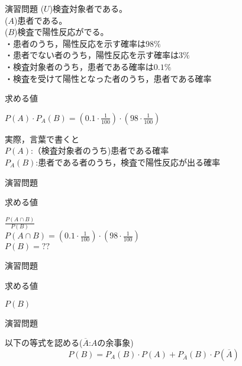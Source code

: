 \documentclass[aspectratio=169, dvipdfmx, 11pt]{beamer}
\begin{document}
\begin{frame}{演習問題}
($U$)検査対象者である。\\
($A$)患者である。\\
($B$)検査で陽性反応がでる。\\

・患者のうち，陽性反応を示す確率は$98\%$\\
・患者でない者のうち，陽性反応を示す確率は$3\%$\\
・検査対象者のうち，患者である確率は$0.1\%$\\
・検査を受けて陽性となった者のうち，患者である確率

\begin{alertblock}{求める値}
\begin{center}
$P(A)\cdot P_A(B)=(0.1\cdot \frac{1}{100})\cdot (98\cdot \frac{1}{100})$
\end{center}
実際，言葉で書くと\\
$P(A)$:（検査対象者のうち)患者である確率\\
$P_A(B)$:患者である者のうち，検査で陽性反応が出る確率
\end{alertblock}
\end{frame}


\begin{frame}{演習問題}

\begin{alertblock}{求める値}
\begin{center}
$\frac{P(A\cap B)}{P(B)}$\\
$P(A\cap B)=(0.1\cdot \frac{1}{100})\cdot (98\cdot \frac{1}{100})$\\
$P(B)=??$
\end{center}
\end{alertblock}

\end{frame}


\begin{frame}{演習問題}

\begin{alertblock}{求める値}
\begin{center}
$P(B)$
\end{center}
\end{alertblock}

\end{frame}


\begin{frame}{演習問題}

\begin{block}{以下の等式を認める($\overline{A}$:$A$の余事象)}
	\begin{equation}
	P(B)=P_A(B)\cdot P(A)+P_{\overline{A}}(B)\cdot P(\overline{A})
	\end{equation}
\end{block}

\end{frame}
\end{document}
